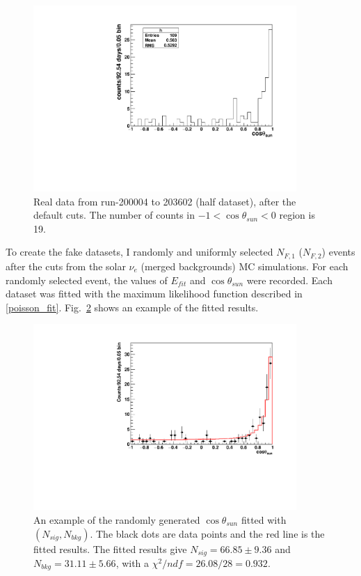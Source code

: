 \begin{figure}[!htb]
	\centering
	\includegraphics[width=10cm]{cosThetaToSun_halfData_5to15.pdf}
	\caption{Real data from run-200004 to 203602 (half dataset), after the default cuts. The number of counts in $-1<\cos\theta_{sun}<0$ region is 19.}
	\label{half_data}
\end{figure}

To create the fake datasets, I randomly and uniformly selected $N_{F,1}$ ($N_{F,2}$) events after the cuts from the solar $\nu_e$ (merged backgrounds) MC simulations. For each randomly selected event, the values of $E_{fit}$ and $\cos\theta_{sun}$ were recorded. Each dataset was fitted with the maximum likelihood function described in \ref{poisson_fit}. Fig.~\ref{ensemble_test} shows an example of the fitted results.

\begin{figure}[!htb]
	\centering
	\includegraphics[width=10cm]{ensemble_fitExample.pdf}
	\caption{An example of the randomly generated $\cos\theta_{sun}$ fitted with $(N_{sig},N_{bkg})$. The black dots are data points and the red line is the fitted results. The fitted results give $N_{sig} = 66.85\pm9.36$ and $N_{bkg} = 31.11 \pm 5.66$, with a $\chi^2/ndf = 26.08/28 = 0.932$.}
	\label{ensemble_test}
\end{figure} 

